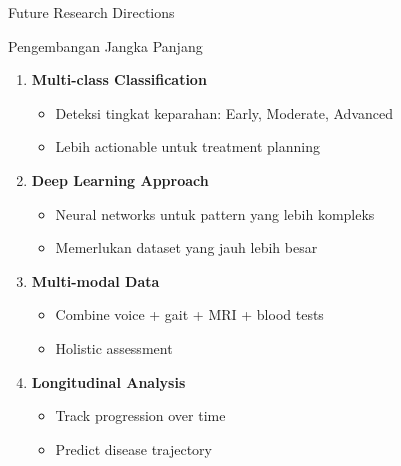 \documentclass[aspectratio=169]{beamer}
\begin{document}
\begin{frame}{Future Research Directions}
\begin{block}{Pengembangan Jangka Panjang}
\begin{enumerate}
    \item \textbf{Multi-class Classification}
    \begin{itemize}
        \item Deteksi tingkat keparahan: Early, Moderate, Advanced
        \item Lebih actionable untuk treatment planning
    \end{itemize}
    
    \item \textbf{Deep Learning Approach}
    \begin{itemize}
        \item Neural networks untuk pattern yang lebih kompleks
        \item Memerlukan dataset yang jauh lebih besar
    \end{itemize}
    
    \item \textbf{Multi-modal Data}
    \begin{itemize}
        \item Combine voice + gait + MRI + blood tests
        \item Holistic assessment
    \end{itemize}
    
    \item \textbf{Longitudinal Analysis}
    \begin{itemize}
        \item Track progression over time
        \item Predict disease trajectory
    \end{itemize}
\end{enumerate}
\end{block}
\end{frame}
\end{document}
